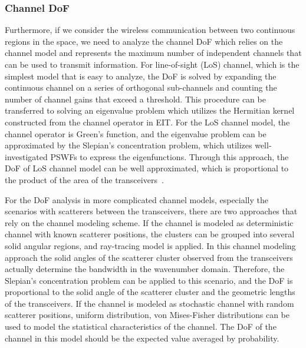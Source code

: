 \documentclass[journal,twocolumn]{IEEEtran}
\begin{document}
\subsubsection{Channel DoF}
Furthermore, if we consider the wireless communication between two continuous regions in the space, we need to analyze the channel DoF which relies on the channel model and represents the maximum number of independent channels that can be used to transmit information. For line-of-sight (LoS) channel, which is the simplest model that is easy to analyze, the DoF is solved by expanding the continuous channel on a series of orthogonal sub-channels and counting the number of channel gains that exceed a threshold. This procedure can be transferred to solving an eigenvalue problem which utilizes the Hermitian kernel constructed from the channel operator in EIT. For the LoS channel model, the channel operator is Green's function, and the eigenvalue problem can be approximated by the Slepian's concentration problem, which utilizes well-investigated PSWFs to express the eigenfunctions. Through this approach, the DoF of LoS channel model can be well approximated, which is proportional to the product of the area of the transceivers~\cite{miller2000communicating}. 

For the DoF analysis in more complicated channel models, especially the scenarios with scatterers between the transceivers, there are two approaches that rely on the channel modeling scheme. 
If the channel is modeled as deterministic channel with known scatterer positions, the clusters can be grouped into several solid angular regions, and ray-tracing model is applied. 
In this channel modeling approach the solid angles of the scatterer cluster observed from the transceivers actually determine the bandwidth in the wavenumber domain. 
Therefore, the Slepian's concentration problem can be applied to this scenario, and the DoF is proportional to the solid angle of the scatterer cluster and the geometric lengths of the transceivers. 
If the channel is modeled as stochastic channel with random scatterer positions, uniform distribution, von Mises-Fisher distributions can be used to model the statistical characteristics of the channel. 
The DoF of the channel in this model should be the expected value averaged by probability.

\end{document}
